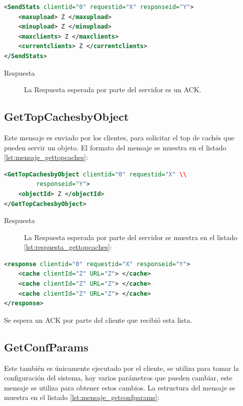\begin{lstlisting}[language=XML,caption={Mensaje de SendStats},label={lst:mensaje_sendstats}]
<SendStats clientid="0" requestid="X" responseid="Y"> 
	<maxupload> Z </maxupload>
	<minupload> Z </minupload>
	<maxclients> Z </maxclients>
	<currentclients> Z </currentclients>
</SendStats>
\end{lstlisting}

\begin{description}
\item[Respuesta] La Respuesta esperada por parte del servidor es un ACK.
\end{description}

\subsection{GetTopCachesbyObject}

Este mensaje es enviado por los clientes, para solicitar el top de cachés que pueden servir un objeto. El formato del mensaje se muestra en el listado \ref{lst:mensaje_gettopcaches}:

\begin{lstlisting}[language=XML,caption={Mensaje de GetTopCachesbyObject},label={lst:mensaje_gettopcaches}]
<GetTopCachesbyObject clientid="0" requestid="X" \\
		 responseid="Y"> 
	<objectId> Z </objectId>
</GetTopCachesbyObject>
\end{lstlisting}


\begin{description}
\item[Respuesta] La Respuesta esperada por parte del servidor se muestra en el listado \ref{lst:respuesta_gettopcaches}:
\end{description}

\begin{lstlisting}[language=XML,caption={Mensaje de Respuesta de GetTopCachesbyObject},label={lst:respuesta_gettopcaches}]
<response clientid="0" requestid="X" responseid="Y"> 
	<cache clientId="Z" URL="Z"> </cache>
	<cache clientId="Z" URL="Z"> </cache>
	<cache clientId="Z" URL="Z"> </cache>
</response>
\end{lstlisting}


Se espera un ACK por parte del cliente que recibió esta lista.

\subsection{GetConfParams}
Este también es únicamente ejecutado por el cliente, se utiliza para tomar la configuración del sistema, hay varios parámetros que pueden cambiar, este mensaje se utiliza para obtener estos cambios. La estructura del mensaje se muestra en el listado \ref{lst:mensaje_getconfparams}:

